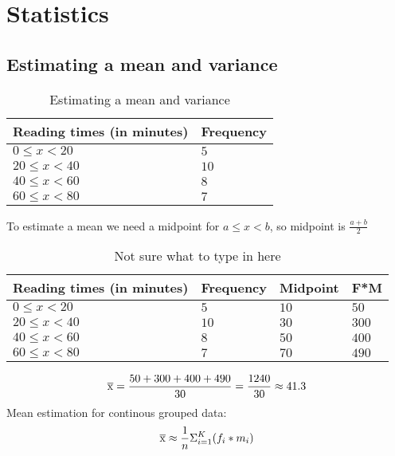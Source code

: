 \documentclass{article}
\begin{document}
\section{Statistics}
\subsection{Estimating a mean and variance}
\begin{table}[htbp]
  \centering
  \begin{tabular}{|l|l|}
    \hline
    \textbf{Reading times (in minutes)} & \textbf{Frequency} \\
    \hline
    $0 \leqslant x < 20$ & $5$ \\
    \hline
    $20 \leqslant x < 40$ & $10$ \\
    \hline
    $40 \leqslant x < 60$ & $8$ \\
    \hline
    $60 \leqslant x < 80$ & $7$ \\
    \hline
  \end{tabular}
  \caption{Estimating a mean and variance}
  \label{tab:estimating_a_mean_and_variance}
\end{table}
To estimate a mean we need a midpoint for $a \leqslant x < b$, so midpoint is $\frac{a+b}{2}$
\begin{table}[htbp]
  \centering
  \begin{tabular}{|l|l|l|l|}
    \hline
    \textbf{Reading times (in minutes)} & \textbf{Frequency} & \textbf{Midpoint} & \textbf{F*M} \\
    \hline
    $0 \leqslant x < 20$ & $5$ & $10$ & $50$ \\
    \hline
    $20 \leqslant x < 40$ & $10$ & $30$ & $300$ \\
    \hline
    $40 \leqslant x < 60$ & $8$ & $50$ & $400$ \\
    \hline
    $60 \leqslant x < 80$ & $7$ & $70$ & $490$ \\
    \hline
  \end{tabular}
  \caption{Not sure what to type in here}
  \label{tab:estimating_a_mean_and_variance_2}
\end{table}
\begin{equation}
  \overline{\rm x} = \frac{50+300+400+490}{30} = \frac{1240}{30} \approx 41.3
\end{equation}
Mean estimation for continous grouped data:
\begin{equation}
  \overline{\rm x} \approx \frac{1}{n}\Sigma^K_{i=1}(f_i * m_i)
\end{equation}
\end{document}
